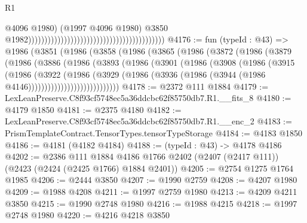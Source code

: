 \begin{lexlean}{R1}
\begin{coremodule}
                                                                                          @4096
                                                                                          @1980)
                                                                                        (@1997
                                                                                          @4096
                                                                                          @1980)
                                                                                        @3850
                                                                                        @1982))))))))))))))))))))))))))))))))))))))))))
@4176 := fun (typeId : @43) =>
  @1986
    (@3851
      (@1986
        (@3858
          (@1986
            (@3865
              (@1986
                (@3872
                  (@1986
                    (@3879
                      (@1986
                        (@3886
                          (@1986
                            (@3893
                              (@1986
                                (@3901
                                  (@1986
                                    (@3908
                                      (@1986
                                        (@3915
                                          (@1986
                                            (@3922
                                              (@1986
                                                (@3929
                                                  (@1986
                                                    (@3936
                                                      (@1986
                                                        (@3944
                                                          (@1986 @4146))))))))))))))))))))))))))))
@4178 := @2372 @111 @1884
@4179 := LexLeanPreserve.C8f93cf5748ec5a36ddcbc62f85750db7.R1.__fits_8
@4180 := @4179 @1850
@4181 := @2375 @4180
@4182 := LexLeanPreserve.C8f93cf5748ec5a36ddcbc62f85750db7.R1.__enc_2
@4183 := PrismTemplateContract.TensorTypes.tensorTypeStorage
@4184 := @4183 @1850
@4186 := @4181 (@4182 @4184)
@4188 := (typeId : @43) -> @4178 @4186
@4202 := @2386
    @111
    @1884
    @4186
    @1766
    @2402
    (@2407 (@2417 @111))
    (@2423 (@2424 (@2425 @1766) @1884 @2401))
@4205 := @2754 @1275 @1764 @1985
@4206 := @2444 @3850
@4207 := @1990 @2759
@4208 := @4207 @1980
@4209 := @1988 @4208
@4211 := @1997 @2759 @1980
@4213 := @4209 @4211 @3850
@4215 := @1990 @2748 @1980
@4216 := @1988 @4215
@4218 := @1997 @2748 @1980
@4220 := @4216 @4218 @3850

\end{coremodule}
\end{lexlean}
